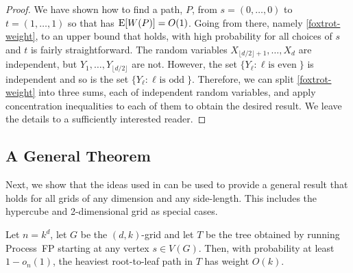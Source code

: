 \documentclass[lotsofwhite]{patmorin}
\begin{document}
\begin{proof}
  We have shown how to find a path, $P$, from $s=(0,\ldots,0)$ to
  $t=(1,\ldots,1)$ so that has $\mathrm{E}[W(P)]=O(1)$.  Going from there,
  namely \eqref{foxtrot-weight}, to an upper bound that holds, with high
  probability for all choices of $s$ and $t$ is fairly straightforward.
  The random variables $X_{\lfloor d/2\rfloor+1},\ldots,X_d$ are
  independent, but $Y_1,\ldots,Y_{\lfloor d/2\rfloor}$ are not. However,
  the set $\{Y_\ell : \mbox{$\ell$ is even} \}$ is independent and so is
  the set $\{Y_\ell : \mbox{$\ell$ is odd} \}$.  Therefore, we can split
  \eqref{foxtrot-weight} into three sums, each of independent random
  variables, and apply concentration inequalities to each of them to
  obtain the desired result.  We leave the details to a sufficiently
  interested reader.
\end{proof}

\subsection{A General Theorem}

Next, we show that the ideas used in 
can be used to provide a general result that holds for all grids of
any dimension and any side-length.  This includes the hypercube and
2-dimensional grid as special cases.

\begin{thm}
   Let $n=k^d$, let $G$ be the $(d,k)$-grid
   and let $T$ be the tree obtained by running Process~FP starting at
   any vertex $s\in V(G)$.  Then, with probability at least $1-o_n(1)$,
   the heaviest root-to-leaf path in $T$ has weight $O(k)$.
\end{thm}
\end{document}
